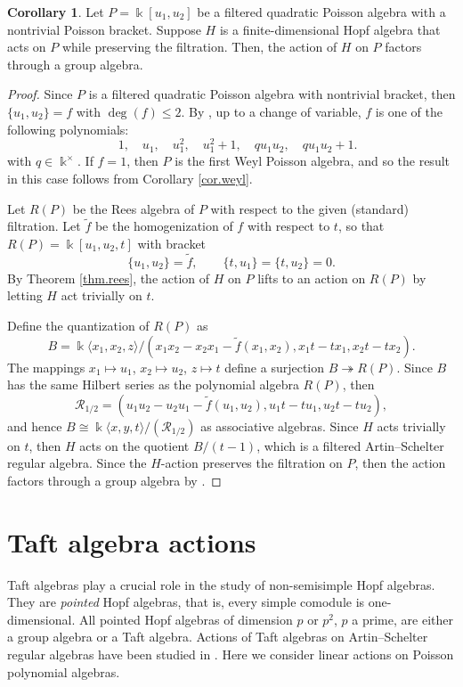 \documentclass[reqno]{amsart}
\numberwithin{equation}{section}
\theoremstyle{definition}
\newtheorem{corollary}[theorem]{Corollary}
\newcommand\kk{\Bbbk}
\newcommand\cR{\mathcal R}
\begin{document}
\begin{corollary}\label{cor.filtered}
Let $P=\kk[u_1,u_2]$ be a filtered quadratic Poisson algebra with a nontrivial Poisson bracket. Suppose $H$ is a finite-dimensional Hopf algebra that acts on $P$ while preserving the filtration. Then, the action of $H$ on $P$ factors through a group algebra.  
\end{corollary}
\begin{proof}
Since $P$ is a filtered quadratic Poisson algebra with nontrivial bracket, then $\{u_1,u_2\} = f$ with $\deg(f) \leq 2$. By \cite[Theorem 3.1]{GWY}, up to a change of variable, $f$ is one of the following polynomials:
\[ \quad 1, \quad u_1, \quad u_1^2, \quad u_1^2+1, \quad qu_1u_2, \quad qu_1u_2 + 1.\]
with $q \in \kk^\times$. If $f=1$, then $P$ is the first Weyl Poisson algebra, and so the result in this case follows from Corollary \ref{cor.weyl}.

Let $R(P)$ be the Rees algebra of $P$ with respect to the given (standard) filtration. Let $\widetilde{f}$ be the homogenization of $f$ with respect to $t$, so that $R(P)=\kk[u_1,u_2,t]$ with bracket
\[ \{u_1,u_2\} = \widetilde{f}, \qquad \{t,u_1\}=\{t,u_2\}= 0.\]
By Theorem \ref{thm.rees}, the action of $H$ on $P$ lifts to an action on $R(P)$ by letting $H$ act trivially on $t$. 

Define the quantization of $R(P)$ as
\[ B = \kk\langle x_1,x_2,z \rangle/(x_1x_2-x_2x_1-\widetilde{f}(x_1,x_2),x_1t-tx_1,x_2t-tx_2).\]
The mappings $x_1 \mapsto u_1$, $x_2\mapsto u_2$, $z\mapsto t$ define a surjection $B \twoheadrightarrow R(P)$. Since $B$ has the same Hilbert series as the polynomial algebra $R(P)$, then 
\[\cR_{1/2}=(u_1u_2-u_2u_1-\widetilde{f}(u_1,u_2), u_1t-tu_1, u_2t-tu_2),\] 
and hence $B\cong \kk\langle x,y,t \rangle/(\cR_{1/2})$ as associative algebras. Since $H$ acts trivially on $t$, then $H$ acts on the quotient $B/(t-1)$, which is a filtered Artin--Schelter regular algebra. Since the $H$-action preserves the filtration on $P$, then the action factors through a group algebra by \cite[Theorem 0.1]{CWWZ2014}.
\end{proof}

\section{Taft algebra actions}
\label{sec.taft}

Taft algebras play a crucial role in the study of non-semisimple Hopf algebras. They are \emph{pointed} Hopf algebras, that is, every simple comodule is one-dimensional. All pointed Hopf algebras of dimension $p$ or $p^2$, $p$ a prime, are either a group algebra or a Taft algebra. Actions of Taft algebras on Artin--Schelter regular algebras have been studied in \cite{CG,CGW,GWY}.
Here we consider linear actions on Poisson polynomial algebras.
\end{document}
